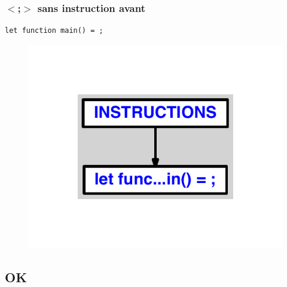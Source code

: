 \documentclass{article}
\begin{document}
\subsubsection{$ < $;$ > $ sans instruction avant}
\begin{lstlisting}
let function main() = ;
\end{lstlisting}
\newpage
\begin{figure}[H]
\centering
\includegraphics[max width=\textwidth]{ast/ast_38.pdf}
\end{figure}
\newpage
\subsection{OK}
\end{document}
